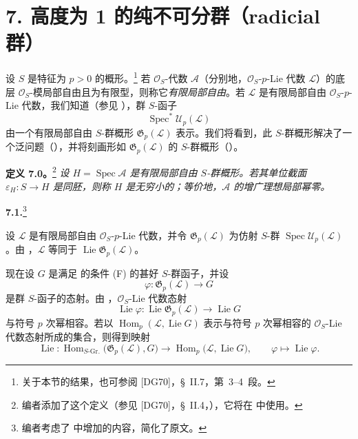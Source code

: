 
\section*{7. 高度为 1 的纯不可分群（radicial 群）}
\label{sga3:VIIA:7}

设 \(S\) 是特征为 \(p>0\) 的概形。\footnote{关于本节的结果，也可参阅 [DG70]，\S~II.7，第~3--4~段。}
若 \(\mathcal O_S\)-代数 \(\mathcal A\)（分别地，\(\mathcal O_S\)-\(p\)-Lie 代数 \(\mathcal L\)）的底层 \(\mathcal O_S\)-模局部自由且为有限型，则称它\emph{有限局部自由}。若 \(\mathcal L\) 是有限局部自由 \(\mathcal O_S\)-\(p\)-Lie 代数，我们知道（参见 ），群 \(S\)-函子
\[
  \operatorname{Spec}^{*}\mathcal U_p(\mathcal L)
\]
由一个有限局部自由 \(S\)-群概形 \(\mathfrak G_p(\mathcal L)\) 表示。我们将看到，此 \(S\)-群概形解决了一个泛问题（），并将刻画形如 \(\mathfrak G_p(\mathcal L)\) 的 \(S\)-群概形（）。

\medskip
\noindent\textbf{定义 7.0。}\footnote{编者添加了这个定义（参见 [DG70]，\S~II.4，），它将在  中使用。}
\label{sga3:VIIA:7.0}
\textit{设 \(H=\operatorname{Spec}\mathcal A\) 是有限局部自由 \(S\)-群概形。若其单位截面 \(\varepsilon_H:S\to H\) 是同胚，则称 \(H\) 是\emph{无穷小的}；等价地，\(\mathcal A\) 的增广理想局部幂零。}

\medskip
\noindent\textbf{7.1.}\footnote{编者考虑了  中增加的内容，简化了原文。}
\label{sga3:VIIA:7.1}

设 \(\mathcal L\) 是有限局部自由 \(\mathcal O_S\)-\(p\)-Lie 代数，并令 \(\mathfrak G_p(\mathcal L)\) 为仿射 \(S\)-群 \(\operatorname{Spec}\mathcal U_p(\mathcal L)\)。由 ，\(\mathcal L\) 等同于 \(\operatorname{Lie}\mathfrak G_p(\mathcal L)\)。

现在设 \(G\) 是满足  的条件 (F) 的甚好 \(S\)-群函子，并设
\[
  \varphi:\mathfrak G_p(\mathcal L)\longrightarrow G
\]
是群 \(S\)-函子的态射。由 ，\(\mathcal O_S\)-Lie 代数态射
\[
  \operatorname{Lie}\varphi:
  \operatorname{Lie}\mathfrak G_p(\mathcal L)
  \longrightarrow
  \operatorname{Lie}G
\]
与符号 \(p\) 次幂相容。若以 \(\operatorname{Hom}_p(\mathcal L,\operatorname{Lie}G)\) 表示与符号 \(p\) 次幂相容的 \(\mathcal O_S\)-Lie 代数态射所成的集合，则得到映射
\[
  \operatorname{Lie}:
  \operatorname{Hom}_{S\text{-Gr.}}
    \bigl(\mathfrak G_p(\mathcal L),G\bigr)
  \longrightarrow
  \operatorname{Hom}_p
    \bigl(\mathcal L,\operatorname{Lie}G\bigr),
  \qquad
  \varphi\longmapsto\operatorname{Lie}\varphi.
\]

